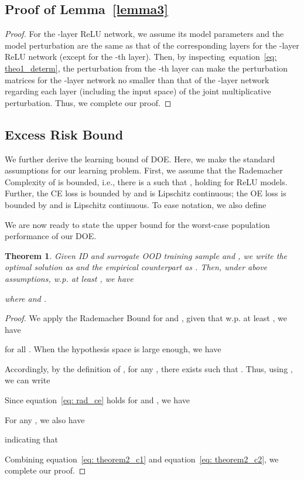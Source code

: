 \documentclass{article} \usepackage{iclr2022_conference,times}
\def\eqref#1{equation~\ref{#1}}
\newtheorem{theorem}{Theorem}
\begin{document}
\subsection{Proof of Lemma~\ref{lemma3}} \label{app: proof2}

\begin{proof}
For the -layer ReLU network, we assume its model parameters and the model perturbation are the same as that of the corresponding layers for the -layer ReLU network (except for the -th layer). {Then, by inspecting~\eqref{eq: theo1_determ}, the perturbation from the -th layer can make the perturbation matrices for the -layer network no smaller than that of the -layer network regarding each layer (including the input space) of the joint multiplicative perturbation.} Thus, we complete our proof. 
\end{proof}


\subsection{Excess Risk Bound} \label{sec: bound}
We further derive the learning bound of DOE. Here, we make the standard assumptions for our learning problem. First, we assume that the Rademacher Complexity  of  is bounded, i.e., there is a  such that , holding for ReLU models. Further, the CE loss is bounded by  and is  Lipschitz continuous; the OE loss is bounded by  and is  Lipschitz continuous. To ease notation, we also define 

We are now ready to state the upper bound for the worst-case population performance of our DOE. 
\begin{theorem}\label{theo3}
\label{theo: rademacher} Given ID and surrogate OOD training sample  and , we write the optimal solution as  and the empirical counterpart as . 
Then, under above assumptions, w.p. at least , we have

where  and . 
\end{theorem}

\label{app: proof3} 
\begin{proof}
We apply the Rademacher Bound for  and , given that w.p. at least , we have 

for all . When the hypothesis space  is large enough, we have 

Accordingly, by the definition of , for any , there exists  such that . Thus, using , we can write

Since \eqref{eq: rad_ce} holds for  and , we have 

For any , we also have 

indicating that 

Combining \eqref{eq: theorem2_c1} and \eqref{eq: theorem2_c2}, we complete our proof. 
\end{proof}
\end{document}
